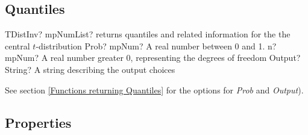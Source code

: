 \subsection{Quantiles}
\label{tDistributionQuantile}

\begin{mpFunctionsExtract}
	\mpFunctionThree
	{TDistInv? mpNumList? returns quantiles and related information for the the central $t$-distribution}
	{Prob? mpNum? A real number between 0 and 1.}
	{n? mpNum? A real number greater 0, representing the degrees of freedom}
	{Output? String? A string describing the output choices}
\end{mpFunctionsExtract}

See section \ref{Functions returning Quantiles} for the options for  {\itshape\sffamily Prob} and {\itshape\sffamily Output}). 

%
%
%







\subsection{Properties}
\label{tDistributionProperties}

